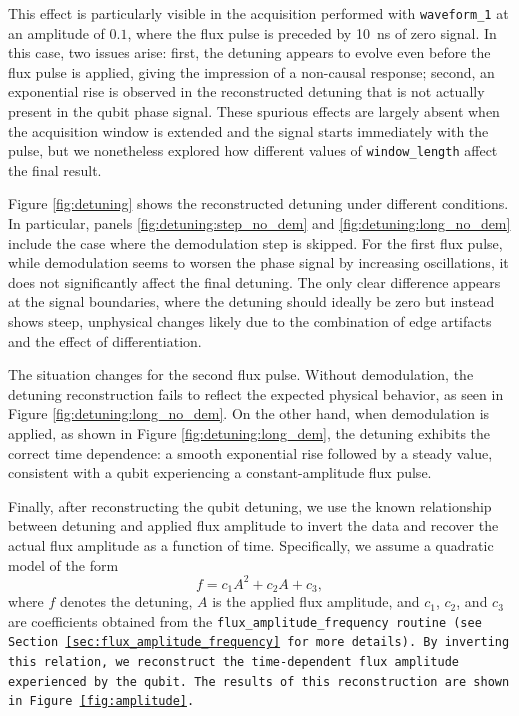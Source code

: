 This effect is particularly visible in the acquisition performed with \texttt{waveform\_1} at an amplitude of $0.1$, where the flux pulse is preceded by 10~ns of zero signal. In this case, two issues arise: first, the detuning appears to evolve even before the flux pulse is applied, giving the impression of a non-causal response; second, an exponential rise is observed in the reconstructed detuning that is not actually present in the qubit phase signal. 
These spurious effects are largely absent when the acquisition window is extended and the signal starts immediately with the pulse, but we nonetheless explored how different values of \texttt{window\_length} affect the final result.

Figure \ref{fig:detuning} shows the reconstructed detuning under different conditions. 
In particular, panels \ref{fig:detuning:step_no_dem} and \ref{fig:detuning:long_no_dem} include the case where the demodulation step is skipped. 
For the first flux pulse, while demodulation seems to worsen the phase signal by increasing oscillations, it does not significantly affect the final detuning. 
The only clear difference appears at the signal boundaries, where the detuning should ideally be zero but instead shows steep, unphysical changes likely due to the combination of edge artifacts and the effect of differentiation.

The situation changes for the second flux pulse. 
Without demodulation, the detuning reconstruction fails to reflect the expected physical behavior, as seen in Figure \ref{fig:detuning:long_no_dem}. 
On the other hand, when demodulation is applied, as shown in Figure \ref{fig:detuning:long_dem}, the detuning exhibits the correct time dependence: a smooth exponential rise followed by a steady value, consistent with a qubit experiencing a constant-amplitude flux pulse.

Finally, after reconstructing the qubit detuning, we use the known relationship between detuning and applied flux amplitude to invert the data and recover the actual flux amplitude as a function of time. Specifically, we assume a quadratic model of the form
\begin{equation}
    f = c_1 A^2 + c_2 A + c_3,
\end{equation}
where $f$ denotes the detuning, $A$ is the applied flux amplitude, and $c_1$, $c_2$, and $c_3$ are coefficients obtained from the \tt{flux\_amplitude\_frequency} routine (see Section \ref{sec:flux_amplitude_frequency} for more details). 
By inverting this relation, we reconstruct the time-dependent flux amplitude experienced by the qubit. 
The results of this reconstruction are shown in Figure~\ref{fig:amplitude}.

